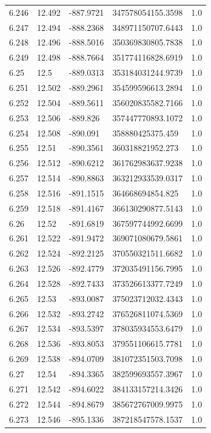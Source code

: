 \begin{tabular}{lllll}
6.246 & 12.492 & -887.9721 & 347578054155.3598 & 1.0 \\
6.247 & 12.494 & -888.2368 & 348971150707.6443 & 1.0 \\
6.248 & 12.496 & -888.5016 & 350369830805.7838 & 1.0 \\
6.249 & 12.498 & -888.7664 & 351774116828.6919 & 1.0 \\
6.25 & 12.5 & -889.0313 & 353184031244.9739 & 1.0 \\
6.251 & 12.502 & -889.2961 & 354599596613.2894 & 1.0 \\
6.252 & 12.504 & -889.5611 & 356020835582.7166 & 1.0 \\
6.253 & 12.506 & -889.826 & 357447770893.1072 & 1.0 \\
6.254 & 12.508 & -890.091 & 358880425375.459 & 1.0 \\
6.255 & 12.51 & -890.3561 & 360318821952.273 & 1.0 \\
6.256 & 12.512 & -890.6212 & 361762983637.9238 & 1.0 \\
6.257 & 12.514 & -890.8863 & 363212933539.0317 & 1.0 \\
6.258 & 12.516 & -891.1515 & 364668694854.825 & 1.0 \\
6.259 & 12.518 & -891.4167 & 366130290877.5143 & 1.0 \\
6.26 & 12.52 & -891.6819 & 367597744992.6699 & 1.0 \\
6.261 & 12.522 & -891.9472 & 369071080679.5861 & 1.0 \\
6.262 & 12.524 & -892.2125 & 370550321511.6682 & 1.0 \\
6.263 & 12.526 & -892.4779 & 372035491156.7995 & 1.0 \\
6.264 & 12.528 & -892.7433 & 373526613377.7249 & 1.0 \\
6.265 & 12.53 & -893.0087 & 375023712032.4343 & 1.0 \\
6.266 & 12.532 & -893.2742 & 376526811074.5369 & 1.0 \\
6.267 & 12.534 & -893.5397 & 378035934553.6479 & 1.0 \\
6.268 & 12.536 & -893.8053 & 379551106615.7781 & 1.0 \\
6.269 & 12.538 & -894.0709 & 381072351503.7098 & 1.0 \\
6.27 & 12.54 & -894.3365 & 382599693557.3967 & 1.0 \\
6.271 & 12.542 & -894.6022 & 384133157214.3426 & 1.0 \\
6.272 & 12.544 & -894.8679 & 385672767009.9975 & 1.0 \\
6.273 & 12.546 & -895.1336 & 387218547578.1537 & 1.0 \\

\end{tabular}
